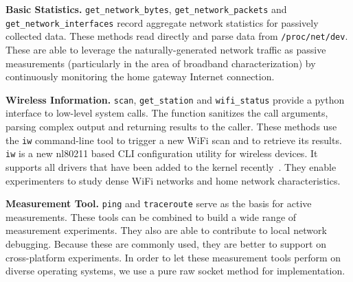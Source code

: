 {\raggedright
\textbf{Basic Statistics.} \texttt{get\_network\_bytes}, \texttt{get\_network\_packets} and \texttt{get\_network\_interfaces} record aggregate network statistics for passively collected data. These methods read directly and parse data from \texttt{/proc/net/dev}. These are able to leverage the naturally-generated network traffic as passive measurements (particularly in the area of broadband characterization) by continuously monitoring the home gateway Internet connection.

\textbf{Wireless Information.} \texttt{scan}, \texttt{get\_station} and \texttt{wifi\_status} provide a python interface to low-level system calls. The function sanitizes the call arguments, parsing complex output and returning results to the caller. These methods use the \texttt{iw} command-line tool to trigger a new WiFi scan and to retrieve its results. \texttt{iw} is a new nl80211 based CLI configuration utility for wireless devices. It supports all drivers that have been added to the kernel recently~\cite{iw}. They enable experimenters to study dense WiFi networks and home network characteristics.

\textbf{Measurement Tool.} \texttt{ping} and \texttt{traceroute} serve as the basis for active measurements. These tools can be combined to build a wide range of measurement experiments. They also are able to contribute to local network debugging. Because these are commonly used, they are better to support on cross-platform experiments. In order to let these measurement tools perform on diverse operating systems, we use a pure raw socket method for implementation. 


}
